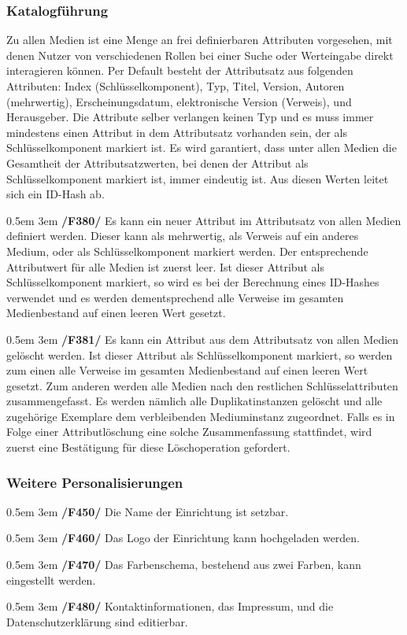 \documentclass{article}
\newcommand{\specification}[3]{
	{\parindent 0.5em \hangindent 3em \hypertarget{spec:#1:#2}{\textbf{/#1#2/}} #3 \par \nobreak \vspace*{0.5em}}
}
\begin{document}
	\subsubsection{Katalogführung}
		Zu allen Medien ist eine Menge an frei definierbaren Attributen vorgesehen, mit denen Nutzer von verschiedenen Rollen bei einer Suche oder Werteingabe direkt interagieren können.
		Per Default besteht der Attributsatz aus folgenden Attributen: Index (Schlüsselkomponent), Typ, Titel, Version, Autoren (mehrwertig), Erscheinungsdatum, elektronische Version (Verweis), und Herausgeber.
		Die Attribute selber verlangen keinen Typ und es muss immer mindestens einen Attribut in dem Attributsatz vorhanden sein, der als Schlüsselkomponent markiert ist.
		Es wird garantiert, dass unter allen Medien die Gesamtheit der Attributsatzwerten, bei denen der Attribut als Schlüsselkomponent markiert ist, immer eindeutig ist. Aus diesen Werten leitet sich ein ID-Hash ab. \par \vspace{0.5em}
		\specification{F}{380}{Es kann ein neuer Attribut im Attributsatz von allen Medien definiert werden. Dieser kann als mehrwertig, als Verweis auf ein anderes Medium, oder als Schlüsselkomponent markiert werden.
			Der entsprechende Attributwert für alle Medien ist zuerst leer.
			Ist dieser Attribut als Schlüsselkomponent markiert, so wird es bei der Berechnung eines ID-Hashes verwendet und es werden dementsprechend alle Verweise im gesamten Medienbestand auf einen leeren Wert gesetzt. }
		\specification{F}{381}{Es kann ein Attribut aus dem Attributsatz von allen Medien gelöscht werden.
			Ist dieser Attribut als Schlüsselkomponent markiert, so werden zum einen alle Verweise im gesamten Medienbestand auf einen leeren Wert gesetzt.
			Zum anderen werden alle Medien nach den restlichen Schlüsselattributen zusammengefasst. Es werden nämlich alle Duplikatinstanzen gelöscht und alle zugehörige Exemplare dem verbleibenden Mediuminstanz zugeordnet.
			Falls es in Folge einer Attributlöschung eine solche Zusammenfassung stattfindet, wird zuerst eine Bestätigung für diese Löschoperation gefordert. }
	\subsubsection{Weitere Personalisierungen}
		\specification{F}{450}{Die Name der Einrichtung ist setzbar. }
		\specification{F}{460}{Das Logo der Einrichtung kann hochgeladen werden. }
		\specification{F}{470}{Das Farbenschema, bestehend aus zwei Farben, kann eingestellt werden. }
		\specification{F}{480}{Kontaktinformationen, das Impressum, und die Datenschutzerklärung sind editierbar. }
\end{document}
